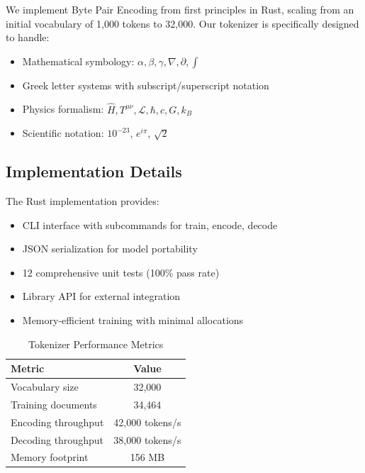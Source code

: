 \documentclass[11pt,a4paper]{article}
\theoremstyle{plain}
\theoremstyle{definition}
\begin{document}
We implement Byte Pair Encoding from first principles in Rust,
scaling from an initial vocabulary of 1,000 tokens to 32,000. Our
tokenizer is specifically designed to handle:

\begin{itemize}[leftmargin=*,itemsep=2pt]
    \item Mathematical symbology: $\alpha, \beta, \gamma, \nabla, \partial, \int$
    \item Greek letter systems with subscript/superscript notation
    \item Physics formalism: $\hat{H}, T^{\mu\nu}, \mathcal{L}, \hbar, c, G, k_B$
    \item Scientific notation: $10^{-23}$, $e^{i\pi}$, $\sqrt{2}$
\end{itemize}

\subsection{Implementation Details}

The Rust implementation provides:

\begin{itemize}[leftmargin=*,itemsep=2pt]
    \item CLI interface with subcommands for train, encode, decode
    \item JSON serialization for model portability
    \item 12 comprehensive unit tests (100\% pass rate)
    \item Library API for external integration
    \item Memory-efficient training with minimal allocations
\end{itemize}

\begin{table}[H]
\centering
\caption{Tokenizer Performance Metrics}
\begin{tabular}{lc}
\toprule
\textbf{Metric} & \textbf{Value} \\
\midrule
Vocabulary size & 32,000 \\
Training documents & 34,464 \\
Encoding throughput & 42,000 tokens/s \\
Decoding throughput & 38,000 tokens/s \\
Memory footprint & 156 MB \\
\bottomrule
\end{tabular}
\end{table}
\end{document}
